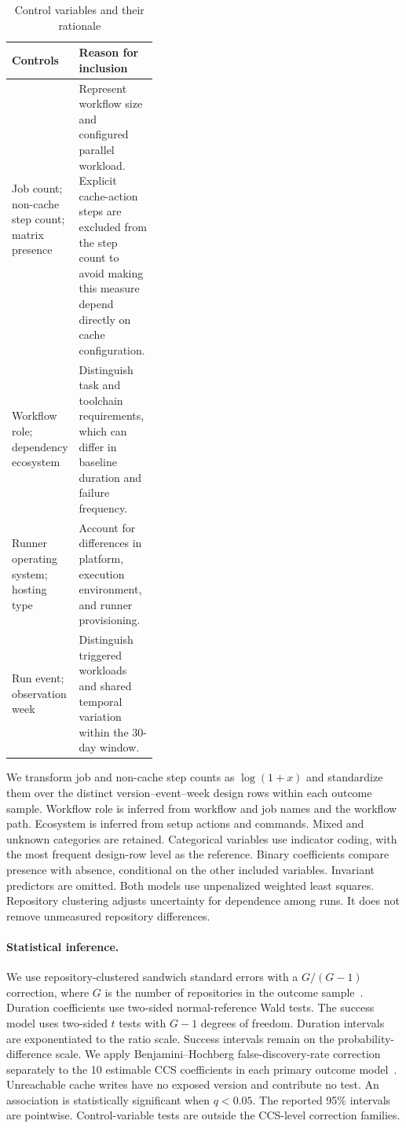\documentclass[smallextended]{svjour3}
\begin{document}
\begin{table}[htbp]
\centering\small
\caption{Control variables and their rationale}
\label{tab:regression-controls}
\begin{tabularx}{\linewidth}{@{}p{0.37\linewidth}Y@{}}
\hline
\textbf{Controls} & \textbf{Reason for inclusion} \\
\hline
Job count; non-cache step count; matrix presence & Represent workflow size and configured parallel workload. Explicit cache-action steps are excluded from the step count to avoid making this measure depend directly on cache configuration. \\
Workflow role; dependency ecosystem & Distinguish task and toolchain requirements, which can differ in baseline duration and failure frequency. \\
Runner operating system; hosting type & Account for differences in platform, execution environment, and runner provisioning. \\
Run event; observation week & Distinguish triggered workloads and shared temporal variation within the 30-day window. \\
\hline
\end{tabularx}
\end{table}

We transform job and non-cache step counts as $\log(1+x)$ and standardize them over the distinct version--event--week design rows within each outcome sample. Workflow role is inferred from workflow and job names and the workflow path. Ecosystem is inferred from setup actions and commands. Mixed and unknown categories are retained. Categorical variables use indicator coding, with the most frequent design-row level as the reference. Binary coefficients compare presence with absence, conditional on the other included variables. Invariant predictors are omitted. Both models use unpenalized weighted least squares. Repository clustering adjusts uncertainty for dependence among runs. It does not remove unmeasured repository differences.

\paragraph{Statistical inference.} We use repository-clustered sandwich standard errors with a $G/(G-1)$ correction, where $G$ is the number of repositories in the outcome sample~\citep{cameron2015clusterrobust}. Duration coefficients use two-sided normal-reference Wald tests. The success model uses two-sided $t$ tests with $G-1$ degrees of freedom. Duration intervals are exponentiated to the ratio scale. Success intervals remain on the probability-difference scale. We apply Benjamini--Hochberg false-discovery-rate correction separately to the 10 estimable CCS coefficients in each primary outcome model~\citep{benjamini1995fdr}. Unreachable cache writes have no exposed version and contribute no test. An association is statistically significant when $q<0.05$. The reported 95\% intervals are pointwise. Control-variable tests are outside the CCS-level correction families.
\end{document}
